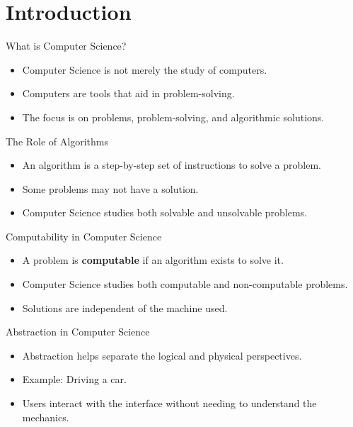 \section{Introduction}
\begin{frame}{What is Computer Science?}
    \begin{itemize}
        \item Computer Science is not merely the study of computers.
        \item Computers are tools that aid in problem-solving.
        \item The focus is on problems, problem-solving, and algorithmic solutions.
    \end{itemize}
\end{frame}

\begin{frame}{The Role of Algorithms}
    \begin{itemize}
        \item An algorithm is a step-by-step set of instructions to solve a problem.
        \item Some problems may not have a solution.
        \item Computer Science studies both solvable and unsolvable problems.
    \end{itemize}
\end{frame}

\begin{frame}{Computability in Computer Science}
    \begin{itemize}
        \item A problem is \textbf{computable} if an algorithm exists to solve it.
        \item Computer Science studies both computable and non-computable problems.
        \item Solutions are independent of the machine used.
    \end{itemize}
\end{frame}

\begin{frame}{Abstraction in Computer Science}
    \begin{itemize}
        \item Abstraction helps separate the logical and physical perspectives.
        \item Example: Driving a car.
        \item Users interact with the interface without needing to understand the mechanics.
    \end{itemize}
\end{frame}

